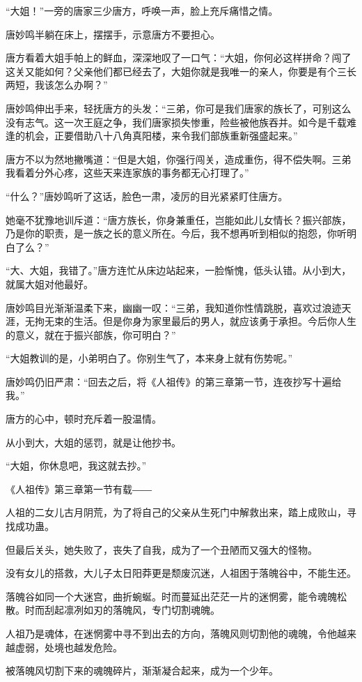 \begin{this_body}
“大姐！”一旁的唐家三少唐方，呼唤一声，脸上充斥痛惜之情。

唐妙鸣半躺在床上，摆摆手，示意唐方不要担心。

唐方看着大姐手帕上的鲜血，深深地叹了一口气：“大姐，你何必这样拼命？闯了这关又能如何？父亲他们都已经去了，大姐你就是我唯一的亲人，你要是有个三长两短，我该怎么办啊？”

唐妙鸣伸出手来，轻抚唐方的头发：“三弟，你可是我们唐家的族长了，可别这么没有志气。这一次王庭之争，我们唐家损失惨重，险些被他族吞并。如今是千载难逢的机会，正要借助八十八角真阳楼，来令我们部族重新强盛起来。”

唐方不以为然地撇嘴道：“但是大姐，你强行闯关，造成重伤，得不偿失啊。三弟我看着分外心疼，这些天来连家族的事务都无心打理了。”

“什么？”唐妙鸣听了这话，脸色一肃，凌厉的目光紧紧盯住唐方。

她毫不犹豫地训斥道：“唐方族长，你身兼重任，岂能如此儿女情长？振兴部族，乃是你的职责，是一族之长的意义所在。今后，我不想再听到相似的抱怨，你听明白了么？”

“大、大姐，我错了。”唐方连忙从床边站起来，一脸惭愧，低头认错。从小到大，就属大姐对他最好。

唐妙鸣目光渐渐温柔下来，幽幽一叹：“三弟，我知道你性情跳脱，喜欢过浪迹天涯，无拘无束的生活。但是你身为家里最后的男人，就应该勇于承担。今后你人生的意义，就在于振兴部族，你可明白？”

“大姐教训的是，小弟明白了。你别生气了，本来身上就有伤势呢。”

唐妙鸣仍旧严肃：“回去之后，将《人祖传》的第三章第一节，连夜抄写十遍给我。”

唐方的心中，顿时充斥着一股温情。

从小到大，大姐的惩罚，就是让他抄书。

“大姐，你休息吧，我这就去抄。”

《人祖传》第三章第一节有载――

人祖的二女儿古月阴荒，为了将自己的父亲从生死门中解救出来，踏上成败山，寻找成功蛊。

但最后关头，她失败了，丧失了自我，成为了一个丑陋而又强大的怪物。

没有女儿的搭救，大儿子太日阳莽更是颓废沉迷，人祖困于落魄谷中，不能生还。

落魄谷如同一个大迷宫，曲折蜿蜒。时而蔓延出茫茫一片的迷惘雾，能令魂魄松散。时而刮起凛冽如刃的落魄风，专门切割魂魄。

人祖乃是魂体，在迷惘雾中寻不到出去的方向，落魄风则切割他的魂魄，令他越来越虚弱，处境也越发危险。

被落魄风切割下来的魂魄碎片，渐渐凝合起来，成为一个少年。


\end{this_body}
